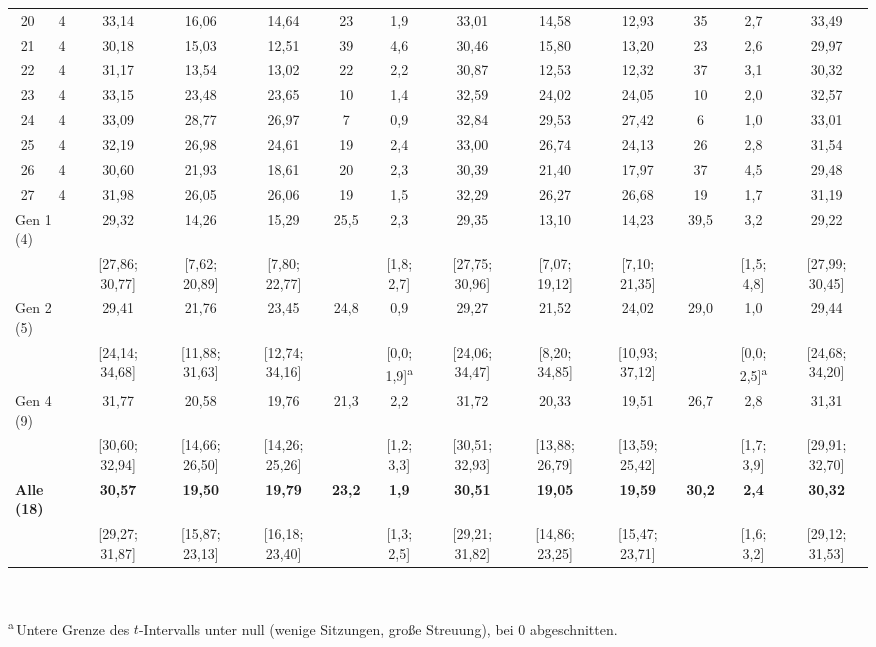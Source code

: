 \documentclass[
  11pt,
  a4paper,
  oneside,
  DIV=12,
  BCOR=8mm,
  parskip=half,
  headings=normal,
  bibliography=totoc,
  listof=totoc
]{scrreprt}
\begin{document}
\begin{table}[htbp]
{\begin{tabular}{cc ccccc ccccc c}
    20 & 4 & 33,14 & 16,06 & 14,64 & 23 & 1,9 & 33,01 & 14,58 & 12,93 & 35 & 2,7 & 33,49 \\
    21 & 4 & 30,18 & 15,03 & 12,51 & 39 & 4,6 & 30,46 & 15,80 & 13,20 & 23 & 2,6 & 29,97 \\
    22 & 4 & 31,17 & 13,54 & 13,02 & 22 & 2,2 & 30,87 & 12,53 & 12,32 & 37 & 3,1 & 30,32 \\
    23 & 4 & 33,15 & 23,48 & 23,65 & 10 & 1,4 & 32,59 & 24,02 & 24,05 & 10 & 2,0 & 32,57 \\
    24 & 4 & 33,09 & 28,77 & 26,97 & 7 & 0,9 & 32,84 & 29,53 & 27,42 & 6 & 1,0 & 33,01 \\
    25 & 4 & 32,19 & 26,98 & 24,61 & 19 & 2,4 & 33,00 & 26,74 & 24,13 & 26 & 2,8 & 31,54 \\
    26 & 4 & 30,60 & 21,93 & 18,61 & 20 & 2,3 & 30,39 & 21,40 & 17,97 & 37 & 4,5 & 29,48 \\
    27 & 4 & 31,98 & 26,05 & 26,06 & 19 & 1,5 & 32,29 & 26,27 & 26,68 & 19 & 1,7 & 31,19 \\
    \midrule
    \multicolumn{2}{l}{Gen 1 (4)} & 29,32 & 14,26 & 15,29 & 25,5 & 2,3 & 29,35 & 13,10 & 14,23 & 39,5 & 3,2 & 29,22 \\
      & & [27,86; 30,77] & [7,62; 20,89] & [7,80; 22,77] & & [1,8; 2,7] & [27,75; 30,96] & [7,07; 19,12] & [7,10; 21,35] & & [1,5; 4,8] & [27,99; 30,45] \\
    \multicolumn{2}{l}{Gen 2 (5)} & 29,41 & 21,76 & 23,45 & 24,8 & 0,9 & 29,27 & 21,52 & 24,02 & 29,0 & 1,0 & 29,44 \\
      & & [24,14; 34,68] & [11,88; 31,63] & [12,74; 34,16] & & [0,0; 1,9]\textsuperscript{a} & [24,06; 34,47] & [8,20; 34,85] & [10,93; 37,12] & & [0,0; 2,5]\textsuperscript{a} & [24,68; 34,20] \\
    \multicolumn{2}{l}{Gen 4 (9)} & 31,77 & 20,58 & 19,76 & 21,3 & 2,2 & 31,72 & 20,33 & 19,51 & 26,7 & 2,8 & 31,31 \\
      & & [30,60; 32,94] & [14,66; 26,50] & [14,26; 25,26] & & [1,2; 3,3] & [30,51; 32,93] & [13,88; 26,79] & [13,59; 25,42] & & [1,7; 3,9] & [29,91; 32,70] \\
    \midrule
    \multicolumn{2}{l}{\textbf{Alle (18)}} & \textbf{30,57} & \textbf{19,50} & \textbf{19,79} & \textbf{23,2} & \textbf{1,9} & \textbf{30,51} & \textbf{19,05} & \textbf{19,59} & \textbf{30,2} & \textbf{2,4} & \textbf{30,32} \\
      & & [29,27; 31,87] & [15,87; 23,13] & [16,18; 23,40] & & [1,3; 2,5] & [29,21; 31,82] & [14,86; 23,25] & [15,47; 23,71] & & [1,6; 3,2] & [29,12; 31,53] \\
    \bottomrule
  \end{tabular}}\\[1mm]
  \parbox{0.95\linewidth}{\footnotesize \textsuperscript{a}\,Untere Grenze
  des $t$-Intervalls unter null (wenige Sitzungen, große Streuung), bei 0
  abgeschnitten.}
\end{table}
\end{document}
